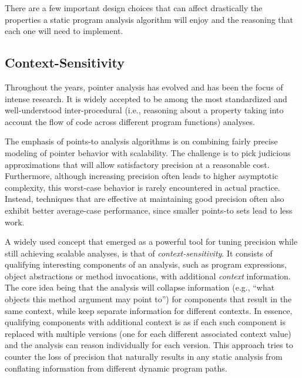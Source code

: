 There are a few important design choices that can affect drastically the
properties a static program analysis algorithm will enjoy and the reasoning
that each one will need to implement.

\subsection{Context-Sensitivity}

Throughout the years, pointer analysis has evolved and has been the focus of
intense research. It is widely accepted to be among the most standardized and
well-understood inter-procedural (i.e., reasoning about a property taking into
account the flow of code across different program functions) analyses.

The emphasis of points-to analysis algorithms is on combining fairly precise modeling of pointer behavior with scalability. The challenge is to pick judicious approximations that will allow satisfactory precision at a reasonable cost. Furthermore, although increasing precision often leads to higher asymptotic complexity, this worst-case behavior is rarely encountered in actual practice. Instead, techniques that are effective at maintaining good precision often also exhibit better average-case performance, since smaller points-to sets lead to less work.

A widely used concept that emerged as a powerful tool for tuning precision
while still achieving scalable analyses, is that of \emph{context-sensitivity}.
It consists of qualifying interesting components of an analysis, such as
program expressions, object abstractions or method invocations, with additional
\emph{context} information. The core idea being that the analysis will collapse
information (e.g., ``what objects this method argument may point to'') for
components that result in the same context, while keep separate information for
different contexts. In essence, qualifying components with additional context
is as if each such component is replaced with multiple versions (one for each
different associated context value) and the analysis can reason individually
for each version. This approach tries to counter the loss of precision that naturally results in any static analysis from conflating information from different dynamic program paths.

